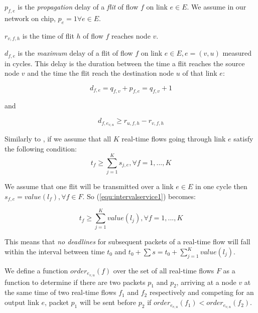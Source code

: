 \documentclass[conference, twocolumn]{IEEEtran}
\theoremstyle{definition}
\begin{document}

 
$p_{f,e}$ is the {\em propagation} delay of a {\em flit} of flow $f$ on link $e
\in E$. We assume in our network on chip, $p_e=1 \forall e \in E$.

$r_{v,f,h}$ is the time of flit $h$ of flow $f$ reaches node $v$.  

$d_{f,e}$ is the {\em maximum} delay of a flit of flow $f$ on link $e \in E,
e=(v,u)$ measured in cycles. This delay is the duration between the time a flit
reaches the source node $v$ and the time the flit reach the destination node
$u$ of that link $e$:

\begin{equation}\label{equ:edgeDelay}
d_{f,e} = q_{f,v} + p_{f,e} = q_{f,v} + 1 
\end{equation}

and

\begin{equation} 
d_{f,e_{v,u}} \geq r_{u,f,h} - r_{v,f,h}
\end{equation}

Similarly to \cite{Ferrari90ascheme}, if we assume that all $K$ 
real-time flows going through link $e$ satisfy the following condition:
\begin{equation}\label{equ:intervalservice1}
t_f \geq \sum_{j=1}^Ks_{j,e}, \forall f = 1,...,K
\end{equation}

We assume that one flit will be transmitted over a link $e \in E$ in one cycle
then $s_{f,e}=value(l_f), \forall f \in F$. So (\ref{equ:intervalservice1})
becomes:

\begin{equation}\label{equ:intervalservice2}
t_f \geq \sum_{j=1}^Kvalue(l_j), \forall f = 1,...,K
\end{equation}

This means that {\em no deadlines} for subsequent packets of a real-time flow
will fall within the interval between time $t_0$ and $t_0 + \sum s = t_0 +
\sum_{j=1}^Kvalue(l_j)$.

We define a function $order_{e_{v,u}}(f)$ over the set of all real-time flows
$F$ as a function to determine if there are two packets $p_1$ and $p_2$, arriving at
a node $v$ at the same time of two real-time flows $f_1$ and $f_2$ respectively
and competing for an output link $e$, packet $p_1$ will be sent before $p_2$ if
$order_{e_{v,u}}(f_1) < order_{e_{v,u}}(f_2)$. 
\end{document}
